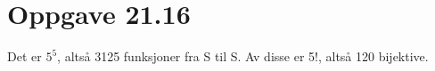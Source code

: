 \documentclass[12pt,norsk,a4paper]{article}
\begin{document}
\section*{Oppgave 21.16}
Det er $5^5$, altså 3125 funksjoner fra S til S.
Av disse er 5!, altså 120 bijektive.


\end{document}
